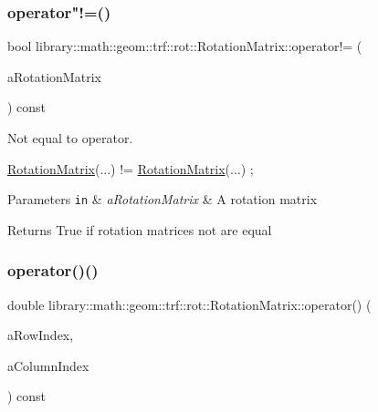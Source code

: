 \subsubsection{\texorpdfstring{operator"!=()}{operator!=()}}
{\footnotesize\ttfamily bool library\+::math\+::geom\+::trf\+::rot\+::\+Rotation\+Matrix\+::operator!= (\begin{DoxyParamCaption}\item[{const \hyperlink{classlibrary_1_1math_1_1geom_1_1trf_1_1rot_1_1_rotation_matrix}{Rotation\+Matrix} \&}]{a\+Rotation\+Matrix }\end{DoxyParamCaption}) const}



Not equal to operator. 


\begin{DoxyCode}
\hyperlink{classlibrary_1_1math_1_1geom_1_1trf_1_1rot_1_1_rotation_matrix_a667d2c05aa5b0cc88775938d11164cdc}{RotationMatrix}(...) != \hyperlink{classlibrary_1_1math_1_1geom_1_1trf_1_1rot_1_1_rotation_matrix_a667d2c05aa5b0cc88775938d11164cdc}{RotationMatrix}(...) ;
\end{DoxyCode}



\begin{DoxyParams}[1]{Parameters}
\mbox{\tt in}  & {\em a\+Rotation\+Matrix} & A rotation matrix \\
\hline
\end{DoxyParams}
\begin{DoxyReturn}{Returns}
True if rotation matrices not are equal 
\end{DoxyReturn}
\mbox{\label{classlibrary_1_1math_1_1geom_1_1trf_1_1rot_1_1_rotation_matrix_a55edc4e5e8514623bd60f2473ec6e93d}} 
\subsubsection{\texorpdfstring{operator()()}{operator()()}\hspace{0.1cm}{\footnotesize\ttfamily [1/2]}}
{\footnotesize\ttfamily double library\+::math\+::geom\+::trf\+::rot\+::\+Rotation\+Matrix\+::operator() (\begin{DoxyParamCaption}\item[{const Index \&}]{a\+Row\+Index,  }\item[{const Index \&}]{a\+Column\+Index }\end{DoxyParamCaption}) const}



